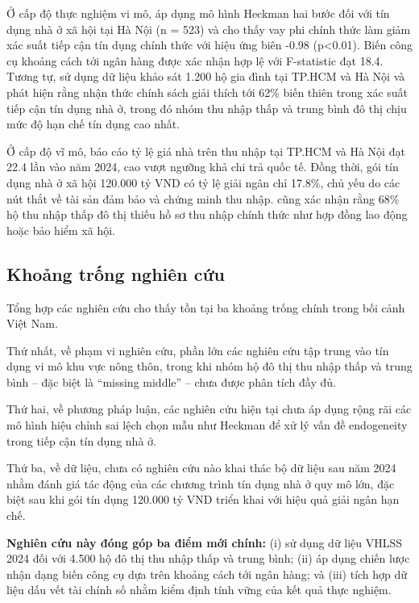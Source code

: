 \documentclass[12pt,a4paper]{report}
\begin{document}
Ở cấp độ thực nghiệm vi mô, \textcite{UEH2023} áp dụng mô hình Heckman hai bước đối với tín dụng nhà ở xã hội tại Hà Nội (n = 523) và cho thấy vay phi chính thức làm giảm xác suất tiếp cận tín dụng chính thức với hiệu ứng biên -0.98 (p<0.01). Biến công cụ khoảng cách tới ngân hàng được xác nhận hợp lệ với F-statistic đạt 18.4. Tương tự, \textcite{Nguyen2024} sử dụng dữ liệu khảo sát 1.200 hộ gia đình tại TP.HCM và Hà Nội và phát hiện rằng nhận thức chính sách giải thích tới 62\% biến thiên trong xác suất tiếp cận tín dụng nhà ở, trong đó nhóm thu nhập thấp và trung bình đô thị chịu mức độ hạn chế tín dụng cao nhất.

Ở cấp độ vĩ mô, \textcite{WB2023} báo cáo tỷ lệ giá nhà trên thu nhập tại TP.HCM và Hà Nội đạt 22.4 lần vào năm 2024, cao vượt ngưỡng khả chi trả quốc tế. Đồng thời, gói tín dụng nhà ở xã hội 120.000 tỷ VND có tỷ lệ giải ngân chỉ 17.8\%, chủ yếu do các nút thắt về tài sản đảm bảo và chứng minh thu nhập. \textcite{SBV2023} cũng xác nhận rằng 68\% hộ thu nhập thấp đô thị thiếu hồ sơ thu nhập chính thức như hợp đồng lao động hoặc bảo hiểm xã hội.

\subsection{Khoảng trống nghiên cứu}

Tổng hợp các nghiên cứu cho thấy tồn tại ba khoảng trống chính trong bối cảnh Việt Nam.

Thứ nhất, về phạm vi nghiên cứu, phần lớn các nghiên cứu tập trung vào tín dụng vi mô khu vực nông thôn, trong khi nhóm hộ đô thị thu nhập thấp và trung bình -- đặc biệt là ``missing middle'' -- chưa được phân tích đầy đủ.

Thứ hai, về phương pháp luận, các nghiên cứu hiện tại chưa áp dụng rộng rãi các mô hình hiệu chỉnh sai lệch chọn mẫu như Heckman để xử lý vấn đề endogeneity trong tiếp cận tín dụng nhà ở.

Thứ ba, về dữ liệu, chưa có nghiên cứu nào khai thác bộ dữ liệu sau năm 2024 nhằm đánh giá tác động của các chương trình tín dụng nhà ở quy mô lớn, đặc biệt sau khi gói tín dụng 120.000 tỷ VND triển khai với hiệu quả giải ngân hạn chế.

\textbf{Nghiên cứu này đóng góp ba điểm mới chính:} (i) sử dụng dữ liệu VHLSS 2024 đối với 4.500 hộ đô thị thu nhập thấp và trung bình; (ii) áp dụng chiến lược nhận dạng biến công cụ dựa trên khoảng cách tới ngân hàng; và (iii) tích hợp dữ liệu dấu vết tài chính số nhằm kiểm định tính vững của kết quả thực nghiệm.
\end{document}
